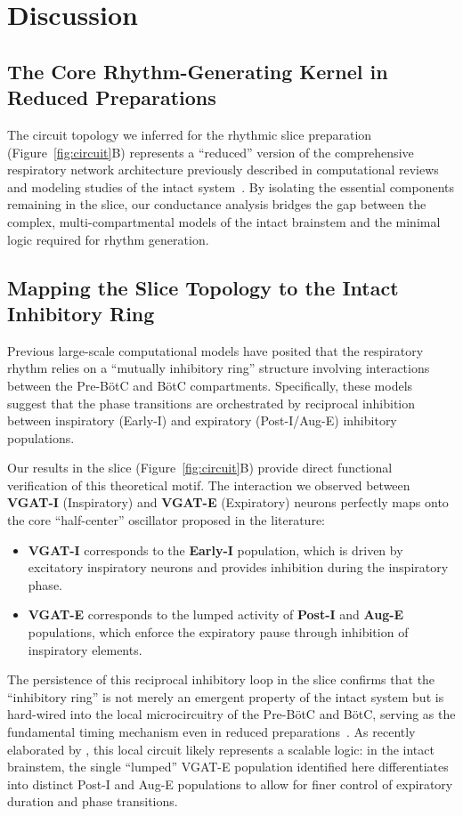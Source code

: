 \documentclass{article}
\begin{document}
\section{Discussion}

\subsection{The Core Rhythm-Generating Kernel in Reduced Preparations}
The circuit topology we inferred for the rhythmic slice preparation (Figure~\ref{fig:circuit}B) represents a ``reduced'' version of the comprehensive respiratory network architecture previously described in computational reviews and modeling studies of the intact system~\citep{smith2013brainstem, ausborn2018organization}. By isolating the essential components remaining in the slice, our conductance analysis bridges the gap between the complex, multi-compartmental models of the intact brainstem and the minimal logic required for rhythm generation.

\subsection{Mapping the Slice Topology to the Intact Inhibitory Ring}
Previous large-scale computational models have posited that the respiratory rhythm relies on a ``mutually inhibitory ring'' structure involving interactions between the Pre-BötC and BötC compartments. Specifically, these models suggest that the phase transitions are orchestrated by reciprocal inhibition between inspiratory (Early-I) and expiratory (Post-I/Aug-E) inhibitory populations.

Our results in the slice (Figure~\ref{fig:circuit}B) provide direct functional verification of this theoretical motif. The interaction we observed between \textbf{VGAT-I} (Inspiratory) and \textbf{VGAT-E} (Expiratory) neurons perfectly maps onto the core ``half-center'' oscillator proposed in the literature:
\begin{itemize}
    \item \textbf{VGAT-I} corresponds to the \textbf{Early-I} population, which is driven by excitatory inspiratory neurons and provides inhibition during the inspiratory phase.
    \item \textbf{VGAT-E} corresponds to the lumped activity of \textbf{Post-I} and \textbf{Aug-E} populations, which enforce the expiratory pause through inhibition of inspiratory elements.
\end{itemize}
The persistence of this reciprocal inhibitory loop in the slice confirms that the ``inhibitory ring'' is not merely an emergent property of the intact system but is hard-wired into the local microcircuitry of the Pre-BötC and BötC, serving as the fundamental timing mechanism even in reduced preparations~\citep{marchenko2016perturbations}. As recently elaborated by \cite{molkov2024inference}, this local circuit likely represents a scalable logic: in the intact brainstem, the single ``lumped'' VGAT-E population identified here differentiates into distinct Post-I and Aug-E populations to allow for finer control of expiratory duration and phase transitions.
\end{document}
